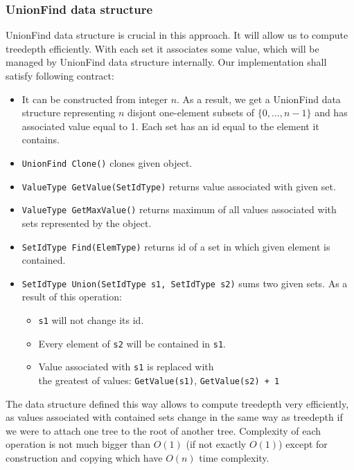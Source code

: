 \subsubsection{UnionFind data structure}
UnionFind data structure is crucial in this approach. It will allow us to compute treedepth efficiently. With each set it associates some value, which will be managed by UnionFind data structure internally. Our implementation shall satisfy following contract:
\begin{itemize}
	\item It can be constructed from integer $n$. As a result, we get a UnionFind data structure representing $n$ disjont one-element subsets of $\{0,...,n-1\}$ and has associated value equal to 1. Each set has an id equal to the element it contains.
	\item \texttt{UnionFind Clone()} clones given object.
	\item \texttt{ValueType GetValue(SetIdType)} returns value associated with given set.
	\item \texttt{ValueType GetMaxValue()} returns maximum of all values associated with sets represented by the object.
	\item \texttt{SetIdType Find(ElemType)} returns id of a set in which given element is contained.
	\item \texttt{SetIdType Union(SetIdType s1, SetIdType s2)} sums two given sets. As a result of this operation:
	\begin{itemize}
		\item \texttt{s1} will not change its id.
		\item Every element of \texttt{s2} will be contained in \texttt{s1}.
		\item Value associated with \texttt{s1} is replaced with \\ the greatest of values: \texttt{GetValue(s1)}, \texttt{GetValue(s2) + 1}
	\end{itemize}
\end{itemize}
The data structure defined this way allows to compute treedepth very efficiently, as values associated with contained sets change in the same way as treedepth if we were to attach one tree to the root of another tree. Complexity of each operation is not much bigger than $O(1)$ (if not exactly $O(1)$) except for construction and copying which have $O(n)$ time complexity.
